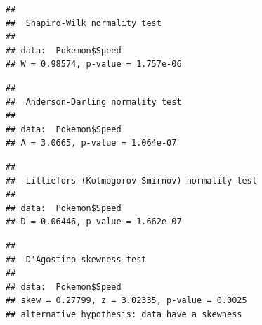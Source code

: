 \documentclass[
]{book}
\newenvironment{Shaded}{\begin{snugshade}}{\end{snugshade}}
\newcommand{\CommentTok}[1]{\textcolor[rgb]{0.56,0.35,0.01}{\textit{#1}}}
\newcommand{\FunctionTok}[1]{\textcolor[rgb]{0.13,0.29,0.53}{\textbf{#1}}}
\newcommand{\NormalTok}[1]{#1}
\newcommand{\SpecialCharTok}[1]{\textcolor[rgb]{0.81,0.36,0.00}{\textbf{#1}}}
\begin{document}
\begin{Shaded}
\end{Shaded}

\begin{verbatim}
## 
##  Shapiro-Wilk normality test
## 
## data:  Pokemon$Speed
## W = 0.98574, p-value = 1.757e-06
\end{verbatim}

\begin{Shaded}
\end{Shaded}

\begin{verbatim}
## 
##  Anderson-Darling normality test
## 
## data:  Pokemon$Speed
## A = 3.0665, p-value = 1.064e-07
\end{verbatim}

\begin{Shaded}
\end{Shaded}

\begin{verbatim}
## 
##  Lilliefors (Kolmogorov-Smirnov) normality test
## 
## data:  Pokemon$Speed
## D = 0.06446, p-value = 1.662e-07
\end{verbatim}

\begin{Shaded}
\end{Shaded}

\begin{verbatim}
## 
##  D'Agostino skewness test
## 
## data:  Pokemon$Speed
## skew = 0.27799, z = 3.02335, p-value = 0.0025
## alternative hypothesis: data have a skewness
\end{verbatim}
\end{document}
